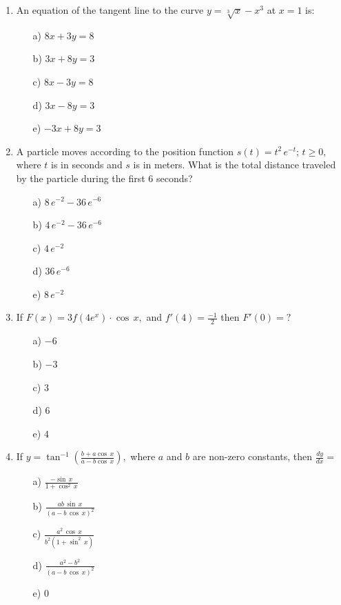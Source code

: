 \documentclass[dvips, 12pt,a4paper]{article}
\begin{document}
\begin{enumerate}
\newpage

\item An equation of the tangent line to the curve $y=\sqrt[3]{x}-x^3$ at $x=1$ is:
\\[0.2in]
\begin{itemize}
\item [a)]$8x+3y=8$
\item [b)]$3x+8y=3$
\item [c)]$8x-3y=8$
\item [d)]$3x-8y=3$
\item [e)]$-3x+8y=3$
\end{itemize}

\vspace{0.8in}

\item A particle moves according to the position function $s(t)=t^2\,e^{-t};\,t\geq 0,$ where $t$ is in seconds and $s$ is in meters. What is the total distance traveled by the particle during the first $6$ seconds?
\\[0.2in]
\begin{itemize}
\item [a)]$8\,e^{-2}-36\,e^{-6}$
\item [b)]$4\,e^{-2}-36\,e^{-6}$
\item [c)]$4\,e^{-2}$
\item [d)]$36\,e^{-6}$
\item [e)]$8\,e^{-2}$
\end{itemize}


\newpage


\item If $F(x)=3f(4e^{x})\cdot\cos\,x,$ and $\displaystyle f'(4)=\frac{-1}{2}$ then $F'(0)=?$
\\[0.2in]
\begin{itemize}
\item [a)]$-6$
\item [b)]$-3$
\item [c)]$3$
\item [d)]$6$
\item [e)]$4$
\end{itemize}

\vspace{0.8in}

\item  If $\displaystyle y=\tan^{-1} \left(\frac{b+a\cos\,x}{a-b\cos\,x}\right),$ where $a$ and $b$ are non-zero constants, then $\displaystyle \frac{dy}{dx}=$
\\[0.2in]
\begin{itemize}
\item [a)]$\displaystyle \frac{-\sin\,x}{1+\cos^{2}\,x}$
\item [b)]$\displaystyle \frac{ab\,\sin\,x}{(a-b\,\cos\,x)^2}$
\item [c)]$\displaystyle \frac{a^2\,\cos\,x}{b^2 (1+\sin^{2}\,x)}$
\item [d)]$\displaystyle \frac{a^2-b^2}{(a-b\,\cos\,x)^2}$
\item [e)]$\displaystyle 0$
\end{itemize}




\end{enumerate}
\end{document}

